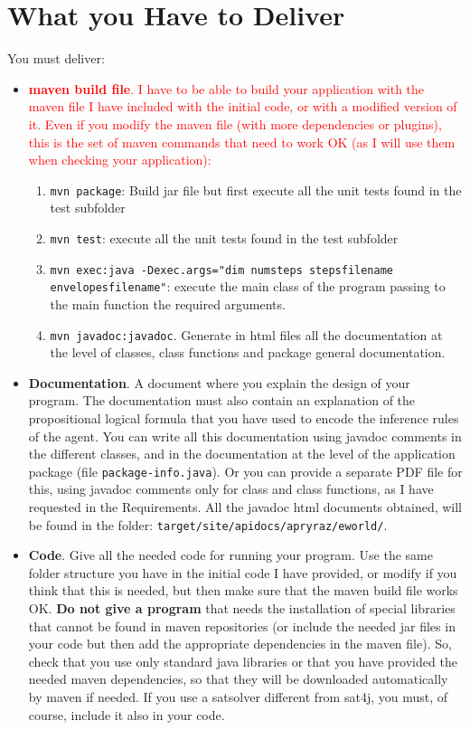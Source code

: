 \documentclass{tufte-handout}
\begin{document}
\section{What you Have to Deliver}

\begin{fullwidth}
You must deliver:
\begin{itemize}
\item  \textcolor{red}{{\bf maven build file}. I have to be able to build your
 application with the maven file I have included with the initial
 code, or with a modified version of it. Even if you modify the maven
 file (with more dependencies or plugins), this is the set of maven commands that
 need to work OK (as I will use them when checking your application):}
\begin{enumerate}
  \item {\tt mvn package}: Build jar file but first execute all the unit tests found in the test
  subfolder
   \item {\tt mvn test}: execute all the unit tests found in the test
   subfolder
  \item {\tt mvn exec:java -Dexec.args="dim numsteps stepsfilename envelopesfilename"}: execute the main
  class of the program passing to the main function the required arguments.
  \item {\tt mvn javadoc:javadoc}. Generate in html files all the documentation at the level
  of classes, class functions and package general documentation.
\end{enumerate}
\item {\bf Documentation}. A document where you explain the
design of your program.
The documentation must also contain an explanation of the
propositional logical formula  that you have used to
encode the inference rules of the agent. You can write all this
documentation using javadoc comments in the different classes, and in the
documentation at the level of the application package (file {\tt package-info.java}).
Or you can provide a separate PDF file for this, using javadoc comments
only for class and class functions, as I have requested in the Requirements.
All the javadoc html documents obtained, will be found in the folder:
{\tt target/site/apidocs/apryraz/eworld/}.
\item {\bf Code}. Give all the needed code for running your
program. Use the same folder structure you have in the initial code I have provided,
or modify if you think that this is needed, but then make sure that the maven build file works
OK. {\bf Do not give a program} that needs the installation of
special  libraries that cannot be found in maven repositories (or include
the needed jar files in your code but then add the appropriate dependencies in the
maven file). So, check that you use only standard  java libraries  or that you have
 provided the needed maven dependencies, so that they will be downloaded
automatically by maven if needed.
If you use a satsolver different from sat4j, you must, of course, include it also in
your code.
\end{itemize}
\end{fullwidth}
\end{document}
